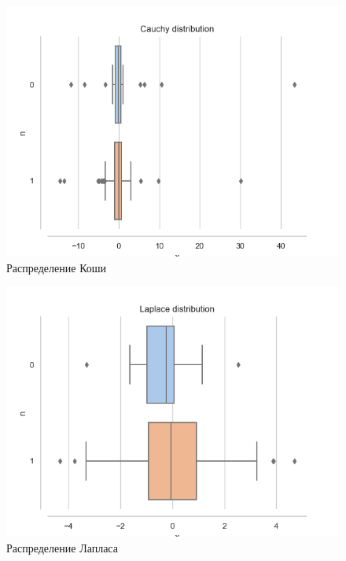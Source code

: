 \documentclass[a4paper,14pt]{article}
\begin{document}
	\begin{figure}[H]
		\centering
		\includegraphics[scale=0.6]{../image/lab3/lab3_cauchy.png}
		\caption{Распределение Коши}
		\label{fig:cauchy}
	\end{figure}
	
	\begin{figure}[H]
		\centering
		\includegraphics[scale=0.6]{../image/lab3/lab3_laplace.png}
		\caption{Распределение Лапласа}
		\label{fig:laplace}
	\end{figure}
	
\end{document}
